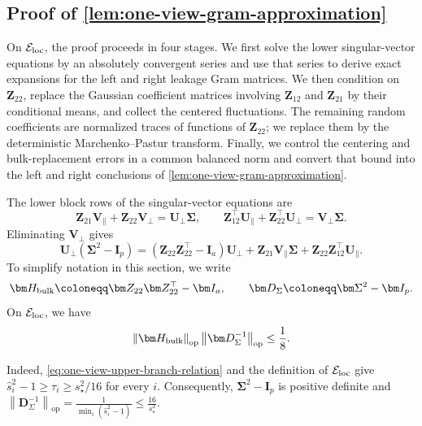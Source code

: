 \documentclass[11pt]{article}
\newcommand{\trans}{\top}
\newcommand{\opn}[1]{\left\lVert #1\right\rVert_{\mathrm{op}}}
\newcommand{\cE}{\mathcal{E}}
\begin{document}
\subsection{Proof of \cref{lem:one-view-gram-approximation}}
\label{app:proof-one-view-gram-approximation}
On $\cE_{\rm loc}$, the proof proceeds in four stages. We first solve the
lower singular-vector equations by an absolutely convergent series and use
that series to derive exact expansions for the left and right leakage Gram
matrices. We then condition on $\bm Z_{22}$, replace the Gaussian coefficient
matrices involving $\bm Z_{12}$ and $\bm Z_{21}$ by their conditional means,
and collect the centered fluctuations. The remaining random coefficients are
normalized traces of functions of $\bm Z_{22}$; we replace them by the
deterministic Marchenko--Pastur transform. Finally, we control the centering
and bulk-replacement errors in a common balanced norm and convert that bound
into the left and right conclusions of
\cref{lem:one-view-gram-approximation}.

The lower block rows of the singular-vector equations are
\begin{equation}
\label{eq:one-view-lower-equations}
  \bm Z_{21}\bm V_\parallel+\bm Z_{22}\bm V_\perp
  =
  \bm U_\perp\bm\Sigma,
  \qquad
  \bm Z_{12}^\trans\bm U_\parallel+\bm Z_{22}^\trans\bm U_\perp
  =
  \bm V_\perp\bm\Sigma.
\end{equation}
Eliminating $\bm V_\perp$ gives
\begin{equation}
\label{eq:one-view-eliminated}
  \bm U_\perp(\bm\Sigma^2-\bm I_p)
  =
  (\bm Z_{22}\bm Z_{22}^\trans-\bm I_a)\bm U_\perp
  +
  \bm Z_{21}\bm V_\parallel\bm\Sigma
  +
  \bm Z_{22}\bm Z_{12}^\trans\bm U_\parallel.
\end{equation}
To simplify notation in this section, we write
\[
\bm H_{\rm bulk} \coloneqq \bm Z_{22}\bm Z_{22}^\trans-\bm I_a, \qquad \bm D_\Sigma \coloneqq \bm\Sigma^2-\bm I_p.
\]
On $\cE_{\rm loc}$, we have 
\begin{equation}\label{eq:one-view-contraction}
   \opn{\bm H_{\rm bulk}}\opn{\bm D_\Sigma^{-1}}
  \le 
  \frac18.   
\end{equation}

Indeed, \cref{eq:one-view-upper-branch-relation} and the definition of
$\cE_{\rm loc}$ give
$\widehat s_i^2-1\ge\tau_i\ge s_\star^2/16$ for every $i$.  Consequently,
$\bm\Sigma^2-\bm I_p$ is positive definite and $  \opn{\bm D_\Sigma^{-1}}
  =
  \frac{1}{\min_i(\widehat s_i^2-1)}
  \le
  \frac{16}{s_\star^2}.$
\end{document}
